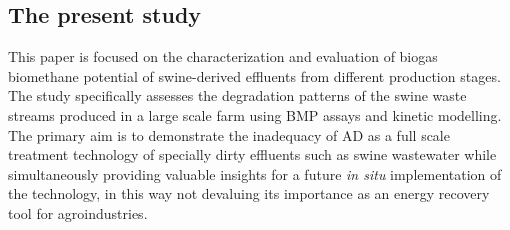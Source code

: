 \subsection{The present study}
This paper is focused on the characterization and evaluation of biogas biomethane potential of swine-derived effluents from different production stages. The study specifically assesses the degradation patterns of the swine waste streams produced in a large scale farm using BMP assays and kinetic modelling. The primary aim is to demonstrate the inadequacy of AD as a full scale treatment technology of specially dirty effluents such as swine wastewater while simultaneously providing valuable insights for a future \textit{in situ} implementation of the technology, in this way not devaluing its importance as an energy recovery tool for agroindustries.